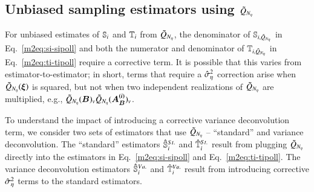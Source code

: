 \subsection{Unbiased sampling estimators using \texorpdfstring{$\Qpoll$}{Qpoll}}
For unbiased estimates of $\S{i}$ and $\T{i}$ from $\Qpoll$, the denominator of $\Spoll{i}$ in Eq.~\eqref{m2eq:si-sipoll} and both the numerator and denominator of $\Tpoll{i}$ in Eq.~\eqref{m2eq:ti-tipoll} require a corrective term.
It is possible that this varies from estimator-to-estimator; 
in short, terms that require a $\hatSigsqeta$ correction arise when $\Qpoll(\bxi)$ is squared, but not when two independent realizations of $\Qpoll$ are multiplied, e.g., $\Qpoll(\bm{B})_v \Qpoll(\bm{A_B^{(i)}})_v$. 

To understand the impact of introducing a corrective variance deconvolution term, we consider two sets of estimators that use $\Qpoll$ -- ``standard'' and variance deconvolution. The ``standard'' estimators $\pollSsalt{i}$ and $\pollTsalt{i}$ result from plugging $\Qpoll$ directly into the estimators in Eq.~\eqref{m2eq:si-sipoll} and Eq.~\eqref{m2eq:ti-tipoll}. The variance deconvolution estimators $\unpollSsalt{i}$ and $\unpollTsalt{i}$ result from introducing corrective $\hatSigsqeta$ terms to the standard estimators.


